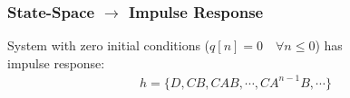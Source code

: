     \subsubsection{State-Space \texorpdfstring{$\rightarrow$}{<->} Impulse Response}
       System with zero initial conditions ($q[n] = 0 \quad \forall n \leq 0$) has \\ impulse response:
        \begin{align*}
            h = \{ D , CB , CAB , \cdots , CA^{n-1}B , \cdots \}
        \end{align*}